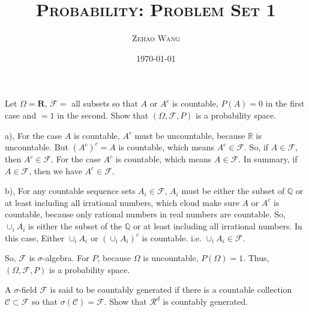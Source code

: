 \documentclass[en, normal, 11pt, black]{elegantnote}
\title{\textsc{Probability: Problem Set 1}}
\author{\textsc{Zehao Wang}}
\date{\today}
\newenvironment{exercise}[1]{\begin{tcolorbox}[colback=black!15, colframe=black!80, breakable, title=#1]}{\end{tcolorbox}}
\renewenvironment{proof}{\begin{tcolorbox}[colback=white, colframe=black!50, breakable, title=Proof. ]\setlength{\parskip}{0.8em}}{\\\rightline{$\square$}\end{tcolorbox}}
\begin{document}
\maketitle
    \begin{exercise}{1.1.1}
        Let $\Omega=\mathbf{R}$, $\mathcal{F}=$ all subsets so that $A$ or $A^c$ is countable, $P(A) = 0$ in the first case and $= 1$ in the second. Show that $(\Omega,\mathcal{F},P)$ is a probability space. 
    \end{exercise}
    \begin{proof}
        a), For the case $A$ is countable, $A^c$ must be uncountable, because $\mathbb{R}$ is uncountable. But $(A^c)^c=A$ is countable, which means $A^c\in\mathcal{F}$. So, if $A\in\mathcal{F}$, then $A^c\in\mathcal{F}$. For the case $A^c$ is countable, which means $A\in\mathcal{F}$. In summary, if $A\in\mathcal{F}$, then we have $A^c\in\mathcal{F}$. 

        b), For any countable sequence sets $A_i\in\mathcal{F}$, $A_i$ must be either the subset of $\mathbb{Q}$ or at least including all irrational numbers, which cloud make sure $A$ or $A^c$ is countable, because only rational numbers in real numbers are countable. So, $\cup_iA_i$ is either the subset of the $\mathbb{Q}$ or at least including all irrational numbers. In this case, Either $\cup_iA_i$ or $(\cup_iA_i)^c$ is countable. i.e. $\cup_iA_i\in\mathcal{F}$. 

        So, $\mathcal{F}$ is $\sigma$-algebra. For $P$, because $\Omega$ is uncountable, $P(\Omega)=1$. Thus, $(\Omega,\mathcal{F},P)$ is a probability space. 
    \end{proof}
    
    \begin{exercise}{1.1.3}
        A $\sigma$-field $\mathcal{F}$ is said to be countably generated if there is a countable collection $\mathcal{C} \subset \mathcal{F}$ so that $\sigma(\mathcal{C}) = \mathcal{F}$. Show that $\mathcal{R}^d$ is countably generated. 
    \end{exercise}
\end{document}
